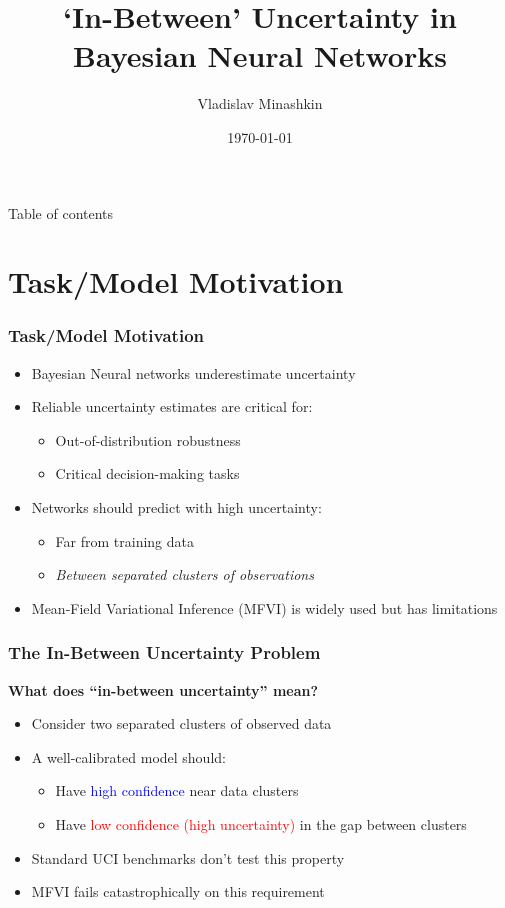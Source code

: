 \documentclass[aspectratio=169, 12pt]{beamer}
\title[\hbox to 56mm{In-Between Uncertainty}]{‘In-Between’ Uncertainty in Bayesian Neural Networks}
\author[Vladislav Minashkin]{Vladislav Minashkin}
\institute{Moscow Institute of Physics and Technology}
\date{\today}
\begin{document}
\maketitle

\begin{frame}{Table of contents}
\tableofcontents
\end{frame}

\section{Task/Model Motivation}
\begin{frame}
\frametitle{Task/Model Motivation}
\begin{itemize}
\item Bayesian Neural networks underestimate uncertainty
\item Reliable uncertainty estimates are critical for:
\begin{itemize}
\item Out-of-distribution robustness
\item Critical decision-making tasks
\end{itemize}
\item Networks should predict with high uncertainty:
\begin{itemize}
\item Far from training data
\item \textit{Between separated clusters of observations}
\end{itemize}
\item Mean-Field Variational Inference (MFVI) is widely used but has limitations
\end{itemize}
\end{frame}

\begin{frame}
\frametitle{The In-Between Uncertainty Problem}
\textbf{What does “in-between uncertainty” mean?}
\vspace{0.3cm}
\begin{itemize}
\item Consider two separated clusters of observed data
\item A well-calibrated model should:
\begin{itemize}
\item Have \textcolor{blue}{high confidence} near data clusters
\item Have \textcolor{red}{low confidence (high uncertainty)} in the gap between clusters
\end{itemize}
\item Standard UCI benchmarks don’t test this property
\item MFVI fails catastrophically on this requirement
\end{itemize}
\end{frame}
\end{document}
